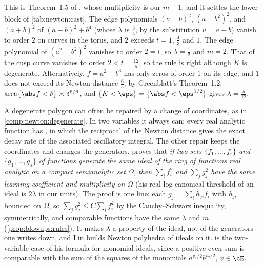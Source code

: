 \begin{refsection}
This is Theorem~1.5 of \textcite{Greenblatt2010}, whose multiplicity is our $m-1$, and it settles the lower block of \cref{tab:newton:cast}. The edge polynomials $(a-b)^2$, $(a-b^2)^2$, and $(a+b)^2$ of $(a+b)^2+b^4$ (whose $\lambda$ is $\frac34$, by the substitution $u=a+b$) vanish to order $2$ on curves in the torus, and $2$ exceeds $t=1$, $\frac43$ and $1$. The edge polynomial of $(a^2-b^2)^2$ vanishes to order $2=t$, so $\lambda=\frac12$ and $m=2$. That of the cusp curve vanishes to order $2<t=\frac{12}5$, so the rule is right although $K$ is degenerate. Alternatively, $f=a^2-b^3$ has only zeros of order $1$ on its edge, and $1$ does not exceed its Newton distance $\frac65$; by Greenblatt's Theorem~1.2, $\mathrm{area}\{\abs f<\delta\}\asymp\delta^{5/6}$, and $\{K<\eps\}=\{\abs f<\eps^{1/2}\}$ gives $\lambda=\frac5{12}$.

A degenerate polygon can often be repaired by a change of coordinates, as in \cref{comp:newton:degenerate}. In two variables it always can: every real analytic function has , in which the reciprocal of the Newton distance gives the exact decay rate of the associated oscillatory integral. The other repair keeps the coordinates and changes the generators. \textcite[Proposition~3.6]{Lin2017} proves that \emph{if two sets $\{f_1,\dots,f_r\}$ and $\{g_1,\dots,g_s\}$ of functions generate the same ideal of the ring of functions real analytic on a compact semianalytic set $\Omega$, then $\sum_if_i^2$ and $\sum_jg_j^2$ have the same learning coefficient and multiplicity on $\Omega$} (his real log canonical threshold of an ideal is $2\lambda$ in our units). The proof is one line: each $g_j=\sum_ih_{ji}f_i$ with $h_{ji}$ bounded on $\Omega$, so $\sum_jg_j^2\le C\sum_if_i^2$ by the Cauchy--Schwarz inequality, symmetrically, and comparable functions have the same $\lambda$ and $m$ (\cref{prop:blowups:rules}). It makes $\lambda$ a property of the ideal, not of the generators one writes down, and Lin builds Newton polyhedra of ideals on it.  is the two-variable case of his formula for monomial ideals, since a positive even sum is comparable with the sum of the squares of the monomials $a^{v_1/2}b^{v_2/2}$, $v\in\cE$.


\end{refsection}
